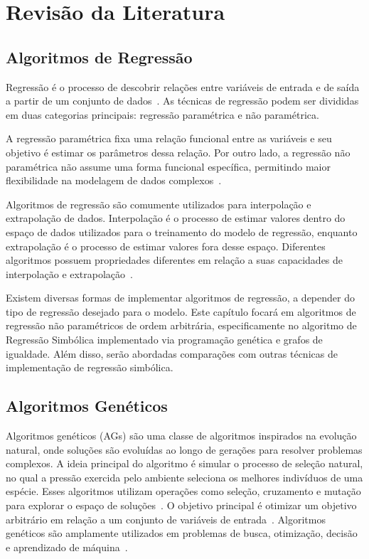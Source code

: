 \chapter{Revisão da Literatura}
\section{Algoritmos de Regressão}

Regressão é o processo de descobrir relações entre variáveis de entrada e de saída a partir de um conjunto de dados~\cite{STULP201560}. As técnicas de regressão podem ser divididas em duas categorias principais: regressão paramétrica e não paramétrica.

A regressão paramétrica fixa uma relação funcional entre as variáveis e seu objetivo é estimar os parâmetros dessa relação. Por outro lado, a regressão não paramétrica não assume uma forma funcional específica, permitindo maior flexibilidade na modelagem de dados complexos~\cite{Angelis2023}.

Algoritmos de regressão são comumente utilizados para interpolação e extrapolação de dados. Interpolação é o processo de estimar valores dentro do espaço de dados utilizados para o treinamento do modelo de regressão, enquanto extrapolação é o processo de estimar valores fora desse espaço. Diferentes algoritmos possuem propriedades diferentes em relação a suas capacidades de interpolação e extrapolação~\cite{Angelis2023}.

Existem diversas formas de implementar algoritmos de regressão, a depender do tipo de regressão desejado para o modelo. Este capítulo focará em algoritmos de regressão não paramétricos de ordem arbitrária, especificamente no algoritmo de Regressão Simbólica implementado via programação genética e grafos de igualdade. Além disso, serão abordadas comparações com outras técnicas de implementação de regressão simbólica.

\section{Algoritmos Genéticos}

Algoritmos genéticos (AGs) são uma classe de algoritmos inspirados na evolução natural, onde soluções são evoluídas ao longo de gerações para resolver problemas complexos. A ideia principal do algoritmo é simular o processo de seleção natural, no qual a pressão exercida pelo ambiente seleciona os melhores indivíduos de uma espécie. Esses algoritmos utilizam operações como seleção, cruzamento e mutação para explorar o espaço de soluções~\cite{Angelis2023,sr_book}. O objetivo principal é otimizar um objetivo arbitrário em relação a um conjunto de variáveis de entrada~\cite{Beyer2002}. Algoritmos genéticos são amplamente utilizados em problemas de busca, otimização, decisão e aprendizado de máquina~\cite{galr}.

